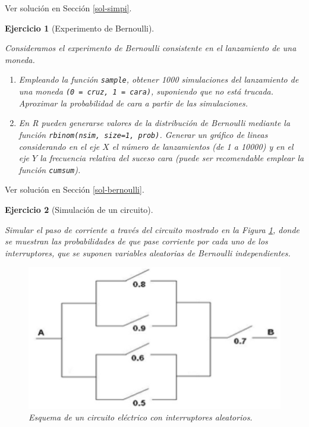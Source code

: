 \documentclass[
]{book}
\theoremstyle{break}
\newtheorem{exercise}{Ejercicio}[chapter]
\theoremstyle{nonumberplain}
\begin{document}
Ver solución en Sección \ref{sol-simpi}.

\begin{exercise}[Experimento de Bernoulli]
\protect\hypertarget{exr:bernoulli}{}\label{exr:bernoulli}

Consideramos el experimento de Bernoulli consistente en el
lanzamiento de una moneda.

\begin{enumerate}
\def\labelenumi{\alph{enumi})}
\item
  Empleando la función \texttt{sample}, obtener 1000 simulaciones del
  lanzamiento de una moneda \texttt{(0\ =\ cruz,\ 1\ =\ cara)}, suponiendo que
  no está trucada. Aproximar la probabilidad de cara a partir de
  las simulaciones.
\item
  En R pueden generarse valores de la distribución de Bernoulli
  mediante la función \texttt{rbinom(nsim,\ size=1,\ prob)}. Generar un
  gráfico de lineas considerando en el eje \(X\) el número de
  lanzamientos (de 1 a 10000) y en el eje \(Y\) la frecuencia
  relativa del suceso cara (puede ser recomendable emplear la
  función \texttt{cumsum}).
\end{enumerate}

\end{exercise}

Ver solución en Sección \ref{sol-bernoulli}.

\begin{exercise}[Simulación de un circuito]
\protect\hypertarget{exr:circuito}{}\label{exr:circuito}

Simular el paso de corriente a través del circuito mostrado en la Figura \ref{fig:circuito2}, donde se muestran las probabilidades de que pase corriente por cada uno de los interruptores, que se suponen variables aleatorias de Bernoulli independientes.

\begin{figure}[!htb]

{\centering \includegraphics[width=0.5\linewidth]{images/circuito2} 

}

\caption{Esquema de un circuito eléctrico con interruptores aleatorios.}\label{fig:circuito2}
\end{figure}

\end{exercise}
\end{document}
